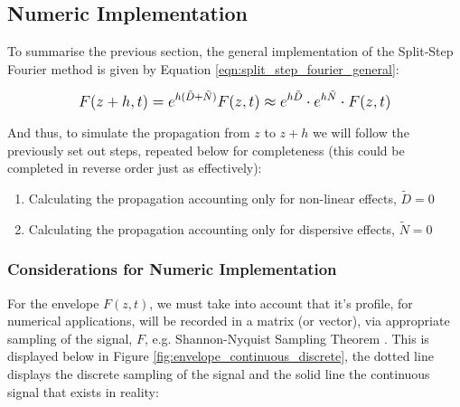 \documentclass[colorlinks,11pt,a4paper,normalphoto,withhyper,ragged2e]{altareport}
\begin{document}
	
	
	
	\pagebreak
	
	
	
	
	\subsection{Numeric Implementation}
		To summarise the previous section, the general implementation of the Split-Step Fourier method is given by Equation \ref{eqn:split_step_fourier_general}: \linebreak
		
		\begin{equation} \label{eqn:split_step_fourier_general}
			\mathlarger{ F(z+h, t) = e^{h (\tilde{D} + \tilde{N})} F(z, t) \approx e^{h \tilde{D}} \cdot e^{h \tilde{N}} \cdot F(z, t)  }
		\end{equation}
		
		\vspace{5mm}
		
		And thus, to simulate the propagation from $z$ to $z+h$ we will follow the previously set out steps, repeated below for completeness (this could be completed in reverse order just as effectively): \linebreak
		
		\begin{enumerate}[leftmargin=1cm]
			\item Calculating the propagation accounting only for non-linear effects, $\tilde{D} = 0$
			\item Calculating the propagation accounting only for dispersive effects, $\tilde{N} = 0$
		\end{enumerate}
		
		\vspace{5mm}
		
		
		\subsubsection{Considerations for Numeric Implementation}
		
			For the envelope $F(z, t)$, we must take into account that it's profile, for numerical applications, will be recorded in a matrix (or vector), via appropriate sampling of the signal, $F$, e.g. Shannon-Nyquist Sampling Theorem \cite{MechatronicsBolton2015} \cite{shannon_nyquist_sampling_theorem}. This is displayed below in Figure \ref{fig:envelope_continuous_discrete}, the dotted line displays the discrete sampling of the signal and the solid line the continuous signal that exists in reality: \linebreak
			
\end{document}
